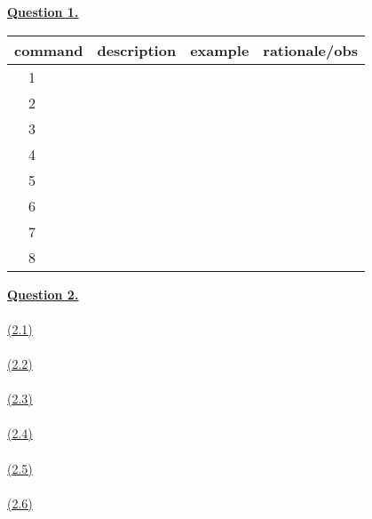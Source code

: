 \documentclass[12pt]{article}
\begin{document}
\hyperlink{toc}{\hypertarget{1}{\LARGE \underline{\textbf{Question 1.}}}}\\
\begin{center}\begin{tabular}{|cc|c|c|c|}
  \hline \multicolumn{2}{|c|}{\cellcolor{gray!25}command} & \cellcolor{gray!25}description & \cellcolor{gray!25}example& \cellcolor{gray!25}rationale/obs\\
		\hline\hline
    1 \texttt{} & & & & \\\hline
		2 \texttt{} & & & & \\\hline
		3 \texttt{} & & & & \\\hline
		4 \texttt{} & & & & \\\hline
		5 \texttt{} & & & & \\\hline
		6 \texttt{} & & & & \\\hline
		7 \texttt{} & & & & \\\hline
		8 \texttt{} & & & & \\\hline
\end{tabular}\end{center}
\newpage
\hyperlink{toc}{\LARGE \underline{\textbf{Question 2.}}}\\
~\\\hyperlink{toc}{\hypertarget{2.1}{(2.1)}}\\
~\\\hyperlink{toc}{\hypertarget{2.2}{(2.2)}}\\
~\\\hyperlink{toc}{\hypertarget{2.3}{(2.3)}}\\
~\\\hyperlink{toc}{\hypertarget{2.4}{(2.4)}}\\
~\\\hyperlink{toc}{\hypertarget{2.5}{(2.5)}}\\
~\\\hyperlink{toc}{\hypertarget{2.6}{(2.6)}}\\
\end{document}
